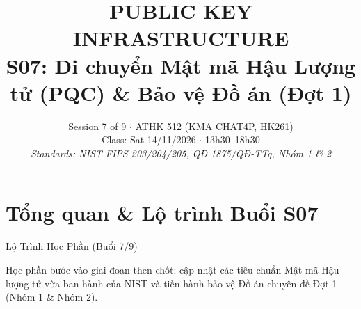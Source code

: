 
\title{\color{hcmutblue}\textbf{\LARGE PUBLIC KEY INFRASTRUCTURE}\\[0.25em]
       \color{hcmutblue}\textbf{\large S07: Di chuyển Mật mã Hậu Lượng tử (PQC) \& Bảo vệ Đồ án (Đợt 1)}}
\date{\footnotesize Session 7 of 9 $\cdot$ ATHK 512 (KMA CHAT4P, HK261)\\
      Class: Sat 14/11/2026 $\cdot$ 13h30--18h30\\
      \textit{Standards: NIST FIPS 203/204/205, QĐ 1875/QĐ-TTg, Nhóm 1 \& 2}}


\PKItitleframe

\section{Tổng quan \& Lộ trình Buổi S07}

\begin{frame}{Lộ Trình Học Phần (Buổi 7/9)}
  \centering
  \vspace{0.4em}
  \raggedright\small
  Học phần bước vào giai đoạn then chốt: cập nhật các tiêu chuẩn Mật mã Hậu lượng tử vừa ban hành của NIST và tiến hành bảo vệ Đồ án chuyên đề Đợt 1 (Nhóm 1 \& Nhóm 2).
\end{frame}

